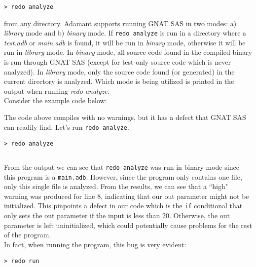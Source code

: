 \vspace{5mm} %
\begin{verbatim}
> redo analyze
\end{verbatim}
\vspace{5mm} %

from any directory. Adamant supports running GNAT SAS in two modes: a) \textit{library} mode and b) \textit{binary} mode. If \texttt{redo analyze} is run in a directory where a \textit{test.adb} or \textit{main.adb} is found, it will be run in \textit{binary} mode, otherwise it will be run in \textit{library} mode. In \textit{binary} mode, all source code found in the compiled binary is run through GNAT SAS (except for test-only source code which is never analyzed). In \textit{library} mode, only the source code found (or generated) in the current directory is analyzed. Which mode is being utilized is printed in the output when running \textit{redo analyze}. \\

Consider the example code below:


The code above compiles with no warnings, but it has a defect that GNAT SAS can readily find. Let's run \texttt{redo analyze}.

\vspace{5mm} %
\begin{verbatim}
> redo analyze
\end{verbatim}
\inputminted{text}{../example_architecture/analyze_demo/output.txt}
\vspace{5mm} %

From the output we can see that \texttt{redo analyze} was run in binary mode since this program is a \texttt{main.adb}. However, since the program only contains one file, only this single file is analyzed. From the results, we can see that a ``high" warning was produced for line 8, indicating that our out parameter might not be initialized. This pinpoints a defect in our code which is the \texttt{if} conditional that only sets the out parameter if the input is less than 20. Otherwise, the out parameter is left uninitialized, which could potentially cause problems for the rest of the program. \\

In fact, when running the program, this bug is very evident:

\vspace{5mm} %
\begin{verbatim}
> redo run 
\end{verbatim}
\inputminted{text}{../example_architecture/analyze_demo/output2.txt}
\vspace{5mm} %

